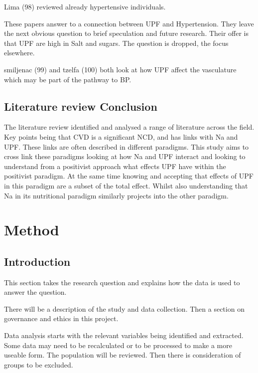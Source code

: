 \documentclass[
]{article}
\begin{document}
Lima (98) reviewed already hypertensive individuals.

These papers answer to a connection between UPF and Hypertension. They
leave the next obvious question to brief speculation and future
research. Their offer is that UPF are high in Salt and sugars. The
question is dropped, the focus elsewhere.

smiljenac (99) and tzelfa (100) both look at how UPF affect the
vasculature which may be part of the pathway to BP.

\hypertarget{literature-review-conclusion}{%
\subsection{Literature review
Conclusion}\label{literature-review-conclusion}}

The literature review identified and analysed a range of literature
across the field. Key points being that CVD is a significant NCD, and
has links with Na and UPF. These links are often described in different
paradigms. This study aims to cross link these paradigms looking at how
Na and UPF interact and looking to understand from a positivist approach
what effects UPF have within the positivist paradigm. At the same time
knowing and accepting that effects of UPF in this paradigm are a subset
of the total effect. Whilst also understanding that Na in its
nutritional paradigm similarly projects into the other paradigm.

\newpage

\hypertarget{method}{%
\section{Method}\label{method}}

\hypertarget{introduction-2}{%
\subsection{Introduction}\label{introduction-2}}

This section takes the research question and explains how the data is
used to answer the question.

There will be a description of the study and data collection. Then a
section on governance and ethics in this project.

Data analysis starts with the relevant variables being identified and
extracted. Some data may need to be recalculated or to be processed to
make a more useable form. The population will be reviewed. Then there is
consideration of groups to be excluded.
\end{document}
